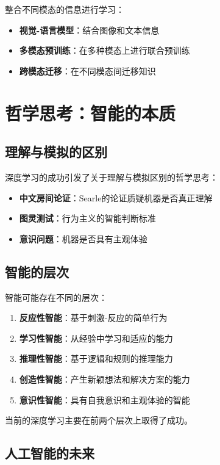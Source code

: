 整合不同模态的信息进行学习：

\begin{itemize}
\item \textbf{视觉-语言模型}：结合图像和文本信息
\item \textbf{多模态预训练}：在多种模态上进行联合预训练
\item \textbf{跨模态迁移}：在不同模态间迁移知识
\end{itemize}

\section{哲学思考：智能的本质}

\subsection{理解与模拟的区别}

深度学习的成功引发了关于理解与模拟区别的哲学思考：

\begin{itemize}
\item \textbf{中文房间论证}：Searle的论证质疑机器是否真正理解
\item \textbf{图灵测试}：行为主义的智能判断标准
\item \textbf{意识问题}：机器是否具有主观体验
\end{itemize}

\subsection{智能的层次}

智能可能存在不同的层次：

\begin{enumerate}
\item \textbf{反应性智能}：基于刺激-反应的简单行为
\item \textbf{学习性智能}：从经验中学习和适应的能力
\item \textbf{推理性智能}：基于逻辑和规则的推理能力
\item \textbf{创造性智能}：产生新颖想法和解决方案的能力
\item \textbf{意识性智能}：具有自我意识和主观体验的智能
\end{enumerate}

当前的深度学习主要在前两个层次上取得了成功。

\subsection{人工智能的未来}

